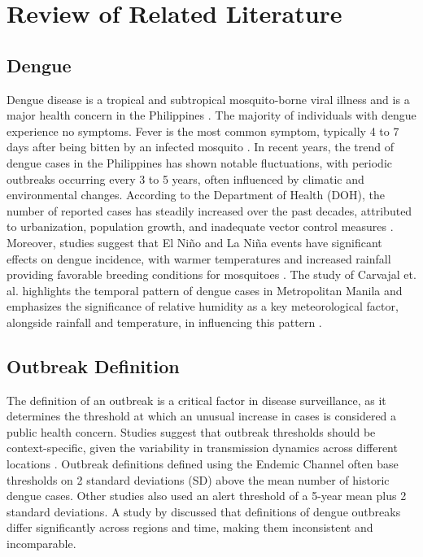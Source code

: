 \chapter{Review of Related Literature}
\label{sec:relatedlit}

\section{Dengue}
Dengue disease is a tropical and subtropical mosquito-borne viral illness and is a major health concern in the Philippines \cite{bravo2014epidemiology}. The majority of individuals with dengue experience no symptoms. Fever is the most common symptom, typically 4 to 7 days after being bitten by an infected mosquito \cite{zhou2024dengue}. In recent years, the trend of dengue cases in the Philippines has shown notable fluctuations, with periodic outbreaks occurring every 3 to 5 years, often influenced by climatic and environmental changes. According to the Department of Health (DOH), the number of reported cases has steadily increased over the past decades, attributed to urbanization, population growth, and inadequate vector control measures \cite{who2018philippines}. Moreover, studies suggest that El Niño and La Niña events have significant effects on dengue incidence, with warmer temperatures and increased rainfall providing favorable breeding conditions for mosquitoes \cite{watts2020climate}. The study of Carvajal et. al. highlights the temporal pattern of dengue cases in Metropolitan Manila and emphasizes the significance of relative humidity as a key meteorological factor, alongside rainfall and temperature, in influencing this pattern \cite{carvajal2018machine}.

\section{Outbreak Definition}
The definition of an outbreak is a critical factor in disease surveillance, as it determines the threshold at which an unusual increase in cases is considered a public health concern. Studies suggest that outbreak thresholds should be context-specific, given the variability in transmission dynamics across different locations \cite{runge2016dengue}. Outbreak definitions defined using the Endemic Channel often base thresholds on 2 standard deviations (SD) above the mean number of historic dengue cases. Other studies \cite{hemisphere2015update} also used an alert threshold of a 5-year mean plus 2 standard deviations. A study by \cite{brady2015dengue} discussed that definitions of dengue outbreaks differ significantly across regions and time, making them inconsistent and incomparable.

